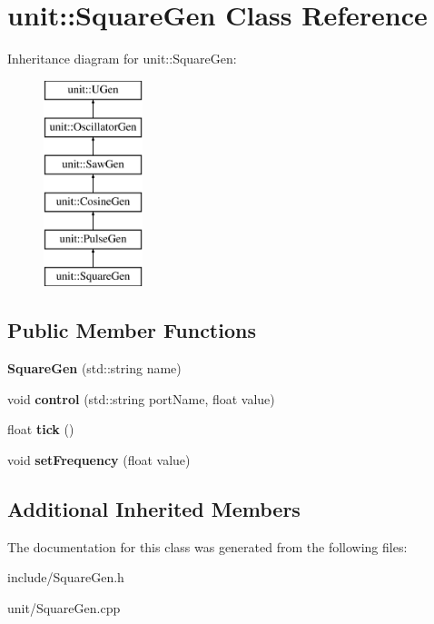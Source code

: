 \hypertarget{classunit_1_1SquareGen}{}\section{unit\+:\+:Square\+Gen Class Reference}
\label{classunit_1_1SquareGen}
Inheritance diagram for unit\+:\+:Square\+Gen\+:\begin{figure}[H]
\begin{center}
\leavevmode
\includegraphics[height=6.000000cm]{classunit_1_1SquareGen}
\end{center}
\end{figure}
\subsection*{Public Member Functions}
\begin{DoxyCompactItemize}
\item 
{\bfseries Square\+Gen} (std\+::string name)\hypertarget{classunit_1_1SquareGen_a626505e8ade08b9383acda8901aa23b5}{}\label{classunit_1_1SquareGen_a626505e8ade08b9383acda8901aa23b5}

\item 
void {\bfseries control} (std\+::string port\+Name, float value)\hypertarget{classunit_1_1SquareGen_a8a25dc2b8c5d1ec7857e4da7ec96cecc}{}\label{classunit_1_1SquareGen_a8a25dc2b8c5d1ec7857e4da7ec96cecc}

\item 
float {\bfseries tick} ()\hypertarget{classunit_1_1SquareGen_a119ab47582ee5814687b87db6a71644c}{}\label{classunit_1_1SquareGen_a119ab47582ee5814687b87db6a71644c}

\item 
void {\bfseries set\+Frequency} (float value)\hypertarget{classunit_1_1SquareGen_a437dde2e640bc9267d937ae3058777de}{}\label{classunit_1_1SquareGen_a437dde2e640bc9267d937ae3058777de}

\end{DoxyCompactItemize}
\subsection*{Additional Inherited Members}


The documentation for this class was generated from the following files\+:\begin{DoxyCompactItemize}
\item 
include/Square\+Gen.\+h\item 
unit/Square\+Gen.\+cpp\end{DoxyCompactItemize}
